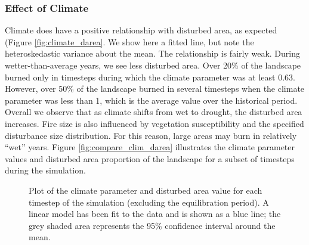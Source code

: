 \subsubsection{Effect of Climate} 
Climate does have a positive relationship with disturbed area, as expected (Figure \ref{fig:climate_darea}. We show here a fitted line, but note the heteroskedastic variance about the mean. The relationship is fairly weak. During wetter-than-average years, we see less disturbed area. Over 20\% of the landscape burned only in timesteps during which the climate parameter was at least 0.63. However, over 50\% of the landscape burned in several timesteps when the climate parameter was less than 1, which is the average value over the historical period. Overall we observe that as climate shifts from wet to drought, the disturbed area increases. %
Fire size is also influenced by vegetation susceptibility and the specified disturbance size distribution. For this reason, large areas may burn in relatively ``wet'' years. Figure \ref{fig:compare_clim_darea} illustrates the climate parameter values and disturbed area proportion of the landscape for a subset of timesteps during the simulation.
\begin{figure}[!htbp]
  \centering
    \caption{Plot of the climate parameter and disturbed area value for each timestep of the simulation (excluding the  equilibration period). A linear model has been fit to the data and is shown as a blue line; the grey shaded area represents  the 95\% confidence interval around the mean.}
  \label{fig:climate_disturbance}
\end{figure}

